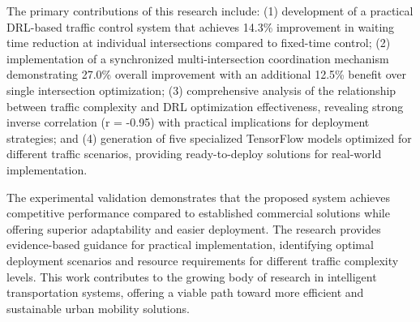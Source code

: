 The primary contributions of this research include: (1) development of a practical DRL-based traffic control system that achieves 14.3\% improvement in waiting time reduction at individual intersections compared to fixed-time control; (2) implementation of a synchronized multi-intersection coordination mechanism demonstrating 27.0\% overall improvement with an additional 12.5\% benefit over single intersection optimization; (3) comprehensive analysis of the relationship between traffic complexity and DRL optimization effectiveness, revealing strong inverse correlation (r = -0.95) with practical implications for deployment strategies; and (4) generation of five specialized TensorFlow models optimized for different traffic scenarios, providing ready-to-deploy solutions for real-world implementation.

The experimental validation demonstrates that the proposed system achieves competitive performance compared to established commercial solutions while offering superior adaptability and easier deployment. The research provides evidence-based guidance for practical implementation, identifying optimal deployment scenarios and resource requirements for different traffic complexity levels. This work contributes to the growing body of research in intelligent transportation systems, offering a viable path toward more efficient and sustainable urban mobility solutions.
